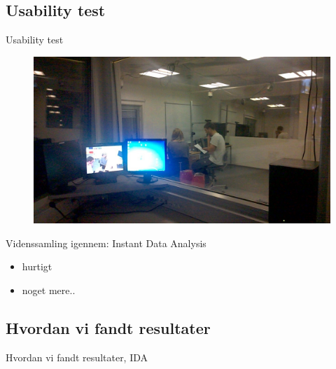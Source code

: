 \subsection{Usability test}
\begin{frame}{Usability test}
	\begin{figure}
		\centering
		\includegraphics{slides/Heider/subjectRoom}
	\end{figure}
	Videnssamling igennem: Instant Data Analysis
	\begin{itemize}
		\item hurtigt
		\item noget mere..
	\end{itemize}
\end{frame}
\subsection{Hvordan vi fandt resultater}
\begin{frame}{Hvordan vi fandt resultater, IDA}
\end{frame}
